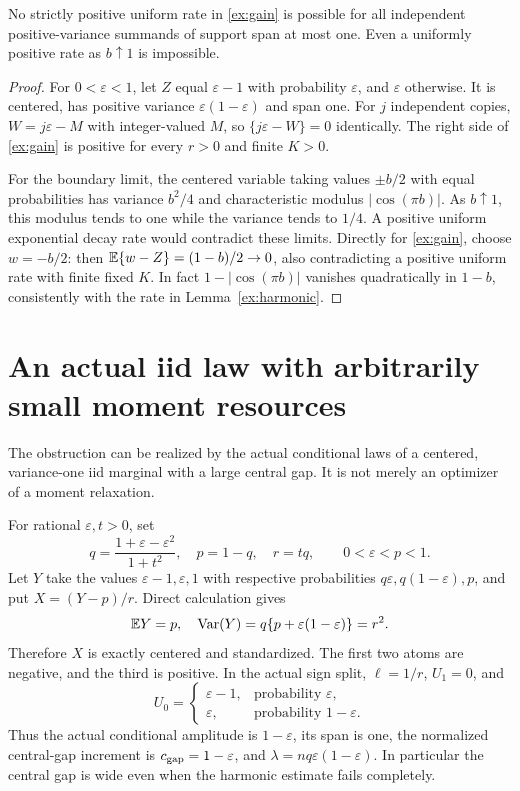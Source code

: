\begin{proposition}\label{ex:boundary}
No strictly positive uniform rate in \eqref{ex:gain} is possible for all
independent positive-variance summands of support span at most one.
Even a uniformly positive rate as $b\uparrow1$ is impossible.
\end{proposition}
\begin{proof}
For $0<\varepsilon<1$, let $Z$ equal $\varepsilon-1$ with probability
$\varepsilon$, and $\varepsilon$ otherwise. It is centered, has positive
variance $\varepsilon(1-\varepsilon)$ and span one.
For $j$ independent copies, $W=j\varepsilon-M$ with integer-valued
$M$, so $\{j\varepsilon-W\}=0$ identically. The right side of
\eqref{ex:gain} is positive for every $r>0$ and finite $K>0$.

For the boundary limit, the centered variable taking values $\pm b/2$
with equal probabilities has variance $b^2/4$ and characteristic modulus
$|\cos(\pi b)|$. As $b\uparrow1$, this modulus tends to one while the
variance tends to $1/4$. A positive uniform exponential decay rate would
contradict these limits. Directly for \eqref{ex:gain}, choose $w=-b/2$:
then $\mathbb E\{w-Z\}=(1-b)/2\to0$, also contradicting a positive uniform
rate with finite fixed $K$. In fact $1-|\cos(\pi b)|$ vanishes quadratically
in $1-b$, consistently with the rate in Lemma~\ref{ex:harmonic}.
\end{proof}

\section{An actual iid law with arbitrarily small moment resources}
The obstruction can be realized by the actual conditional laws of a
centered, variance-one iid marginal with a large central gap. It is not
merely an optimizer of a moment relaxation.

For rational $\varepsilon,t>0$, set
\begin{equation}\label{ex:family}
 q=\frac{1+\varepsilon-\varepsilon^2}{1+t^2},\quad
 p=1-q,\quad r=tq,
 \qquad 0<\varepsilon<p<1.
\end{equation}
Let $Y$ take the values $\varepsilon-1,\varepsilon,1$ with respective
probabilities $q\varepsilon,q(1-\varepsilon),p$, and put $X=(Y-p)/r$.
Direct calculation gives
\[
 \mathbb E Y=p,\quad
 \operatorname{Var}(Y)=q\{p+\varepsilon(1-\varepsilon)\}=r^2.
\]
Therefore $X$ is exactly centered and standardized. The first two atoms
are negative, and the third is positive. In the actual sign split,
$\ell=1/r$, $U_1=0$, and
\[
 U_0=\begin{cases}\varepsilon-1,&\text{probability }\varepsilon,\\
                  \varepsilon,&\text{probability }1-\varepsilon.
       \end{cases}
\]
Thus the actual conditional amplitude is $1-\varepsilon$, its span is
one, the normalized central-gap increment is $c_{\rm gap}=1-\varepsilon$,
and $\lambda=nq\varepsilon(1-\varepsilon)$.
In particular the central gap is wide even when the harmonic estimate
fails completely.

